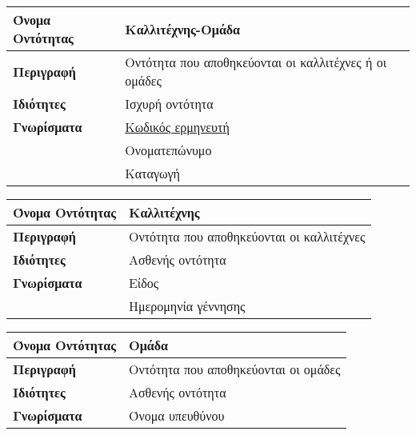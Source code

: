 \begin{center}
\vspace{0.3 cm}

\begin{tabular}[]{|p{4cm}|p{10cm}|}
\hline
\textbf{Όνομα Οντότητας} & Καλλιτέχνης-Ομάδα                         \\ \hline 
\textbf{Περιγραφή}       & Οντότητα που αποθηκεύονται οι καλλιτέχνες ή οι ομάδες \\ \hline 
\textbf{Ιδιότητες}       & Ισχυρή οντότητα                           \\    \hline           
\textbf{Γνωρίσματα}      & \underline{Κωδικός ερμηνευτή}             \\
                         & Ονοματεπώνυμο                             \\
           ~             & Καταγωγή                                  \\
\hline
\end{tabular}
\vspace{0.3 cm}

\begin{tabular}[]{|p{4cm}|p{10cm}|} 
 \hline
\textbf{Όνομα Οντότητας} & Καλλιτέχνης                               \\ \hline 
\textbf{Περιγραφή}       & Οντότητα που αποθηκεύονται οι καλλιτέχνες \\ \hline 
\textbf{Ιδιότητες}       & Ασθενής  οντότητα
                                                                     \\ \hline          
\textbf{Γνωρίσματα}      & Είδος                                     \\
                         & Ημερομηνία γέννησης
                                                                     \\ \hline 
\end{tabular}
\vspace{0.3 cm}

\begin{tabular}[]{|p{4cm}|p{10cm}|}
\hline
\textbf{Όνομα Οντότητας} & Ομάδα                                \\ \hline 
\textbf{Περιγραφή}       & Οντότητα που αποθηκεύονται οι ομάδες \\ \hline 
\textbf{Ιδιότητες}       & Ασθενής  οντότητα                      \\ \hline
\textbf{Γνωρίσματα}      & Όνομα υπευθύνου                      \\ \hline 
\end{tabular}
\vspace{0.3 cm}


\end{center}
